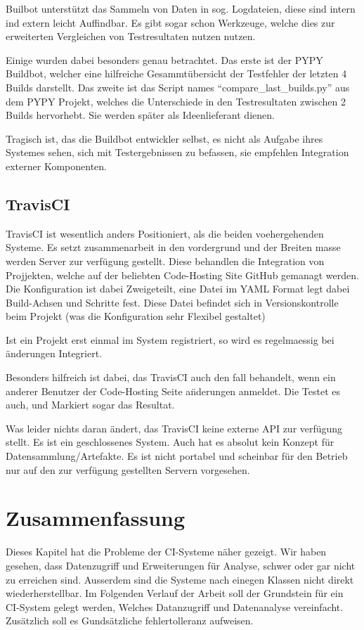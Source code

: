 Builbot unterst\"utzt das Sammeln von Daten in sog. Logdateien,
diese sind intern ind extern leicht Auffindbar.
Es gibt sogar schon Werkzeuge, welche dies zur erweiterten Vergleichen von Testresultaten nutzen nutzen.

Einige wurden dabei besonders genau betrachtet.
Das erste ist der PYPY Buildbot, welcher eine hilfreiche Gesammt\"ubersicht der Testfehler
der letzten 4 Builds darstellt.
Das zweite ist das Script names ``compare\_last\_builds.py'' aus dem PYPY Projekt,
welches die Unterschiede in den Testresultaten zwischen 2 Builds hervorhebt.
Sie werden sp\"ater als Ideenlieferant dienen.

Tragisch ist, das die Buildbot entwickler selbst,
es nicht als Aufgabe ihres Systemes sehen, sich mit Testergebnissen zu befassen,
sie empfehlen Integration externer Komponenten.

\subsection{TravisCI}


TravisCI ist wesentlich anders Positioniert, als die beiden voehergehenden Systeme.
Es setzt zusammenarbeit in den vordergrund und der Breiten masse werden Server zur verf\"ugung gestellt.
Diese behandlen die Integration von Projjekten, welche auf der beliebten Code-Hosting Site GitHub gemanagt werden.
Die Konfiguration ist dabei Zweigeteilt,
eine Datei im YAML Format legt dabei Build-Achsen und Schritte fest.
Diese Datei befindet sich in Versionskontrolle beim Projekt
(was die Konfiguration sehr Flexibel gestaltet)

Ist ein Projekt erst einmal im System registriert,
so wird es regelmaessig bei \"anderungen Integriert.

Besonders hilfreich ist dabei, das TravisCI auch den fall behandelt, wenn ein anderer Benutzer der Code-Hosting Seite a\"nderungen anmeldet.
Die Testet es auch, und Markiert sogar das Resultat.

Was leider nichts daran \"andert, das TravisCI keine externe API zur verf\"ugung stellt.
Es ist ein geschlossenes System. Auch hat es absolut kein Konzept f\"ur Datensammlung/Artefakte.
Es ist nicht portabel und scheinbar f\"ur den Betrieb nur auf den zur verf\"ugung gestellten Servern vorgesehen.


\section{Zusammenfassung}

Dieses Kapitel hat die Probleme der CI-Systeme n\"aher gezeigt.
Wir haben gesehen, dass Datenzugriff und Erweiterungen f\"ur Analyse,
schwer oder gar nicht zu erreichen sind.
Ausserdem sind die Systeme nach einegen Klassen nicht direkt wiederherstellbar.
Im Folgenden Verlauf der Arbeit soll der Grundstein f\"ur ein CI-System gelegt werden,
Welches Datanzugriff und Datenanalyse vereinfacht.
Zus\"atzlich soll es Gunds\"atzliche fehlertolleranz aufweisen.



